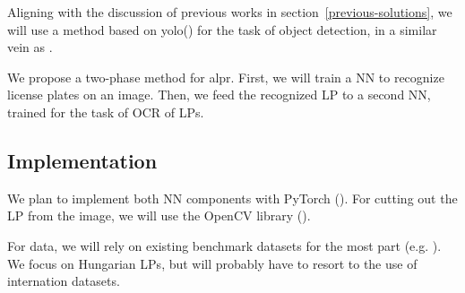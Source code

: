Aligning with the discussion of previous works in
section~\ref{previous-solutions}, we will use
a method based on \ac{yolo}(\cite{redmon2016look}) for the task of object
detection, in a similar vein as \cite{DBLP:journals/corr/abs-1909-01754}. 

We propose a two-phase method for \ac{alpr}. First, we will train a \ac{NN} to
recognize license plates on an image. Then, we feed the recognized \ac{LP} to
a second \ac{NN}, trained for the task of \ac{OCR} of \ac{LP}s.

\subsection{Implementation}
We plan to implement both \ac{NN} components with PyTorch (\cite{pytorch}).
For cutting out the \ac{LP} from the image, we will use the OpenCV library
(\cite{opencv}).

For data, we will rely on existing benchmark datasets for the most part (e.g.
\cite{DBLP:journals/corr/GoncalvesSMS16}). We focus on Hungarian \ac{LP}s, but
will probably have to resort to the use of internation datasets.
